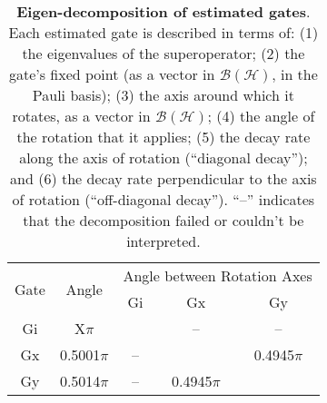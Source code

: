 {\begin{table}[h]
\begin{center}
\vspace{2em}
\begin{tabular}[l]{|c|c|c|c|c|}
\hline
\multirow{2}{*}{Gate} & \multirow{2}{*}{Angle} & \multicolumn{3}{c|}{Angle between Rotation Axes} \\ \cline{3-5}
 & & Gi & Gx & Gy \\ \hline
Gi & X$\pi$ &  & -- & -- \\ \hline
Gx & 0.5001$\pi$ & -- &  & 0.4945$\pi$ \\ \hline
Gy & 0.5014$\pi$ & -- & 0.4945$\pi$ &  \\ \hline
\end{tabular}

\caption{\textbf{Eigen-decomposition of estimated gates}.  Each estimated gate is described in terms of: (1) the eigenvalues of the superoperator; (2) the gate's fixed point (as a vector in $\mathcal{B}(\mathcal{H})$, in the Pauli basis); (3)  the axis around which it rotates, as a vector in $\mathcal{B}(\mathcal{H})$; (4) the angle of the rotation that it applies; (5) the decay rate along the axis of rotation (``diagonal decay''); and (6) the decay rate perpendicular to the axis of rotation (``off-diagonal decay'').  ``--'' indicates that the decomposition failed or couldn't be interpreted. \label{bestTargetSpamGatesetDecompTable}}
\end{center}
\end{table}


}
